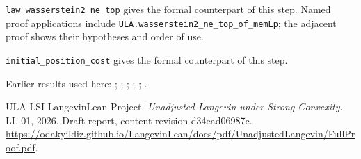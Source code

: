\documentclass[11pt,a4paper]{article}
\begin{document}
\begin{leanbox}
\texttt{law\_\allowbreak{}wasserstein2\_\allowbreak{}ne\_\allowbreak{}top} gives the formal counterpart of this step. Named proof applications include \texttt{ULA.\allowbreak{}wasserstein2\_\allowbreak{}ne\_\allowbreak{}top\_\allowbreak{}of\_\allowbreak{}mem\allowbreak{}Lp}; the adjacent proof shows their hypotheses and order of use.




\texttt{initial\_\allowbreak{}position\_\allowbreak{}cost} gives the formal counterpart of this step.
\end{leanbox}


Earlier results used here: \cite[Section~3.17.1]{LangevinLean2026ULASC}; \cite[Section~3.17.2]{LangevinLean2026ULASC}; \cite[Section~3.17.3]{LangevinLean2026ULASC}; \cite[Section~3.18.2]{LangevinLean2026ULASC}; \cite[Section~3.21.2]{LangevinLean2026ULASC}; \cite[Section~3.22.23]{LangevinLean2026ULASC}.

\begin{thebibliography}{ULA-LSI}
LangevinLean Project. \emph{Unadjusted Langevin under Strong Convexity}. LL-01, 2026. Draft report, content revision d34ead06987c. \url{https://odakyildiz.github.io/LangevinLean/docs/pdf/UnadjustedLangevin/FullProof.pdf}.
\end{thebibliography}
\end{document}
